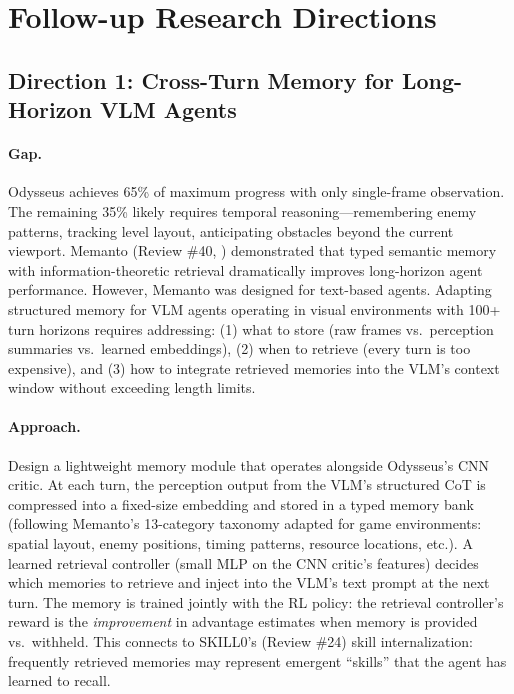\documentclass[11pt]{article}
\begin{document}
\section{Follow-up Research Directions}

\subsection{Direction 1: Cross-Turn Memory for Long-Horizon VLM Agents}

\paragraph{Gap.}
Odysseus achieves 65\% of maximum progress with only single-frame observation. The remaining 35\% likely requires temporal reasoning---remembering enemy patterns, tracking level layout, anticipating obstacles beyond the current viewport. Memanto (Review \#40, \cite{memanto}) demonstrated that typed semantic memory with information-theoretic retrieval dramatically improves long-horizon agent performance. However, Memanto was designed for text-based agents. Adapting structured memory for VLM agents operating in visual environments with 100+ turn horizons requires addressing: (1) what to store (raw frames vs.\ perception summaries vs.\ learned embeddings), (2) when to retrieve (every turn is too expensive), and (3) how to integrate retrieved memories into the VLM's context window without exceeding length limits.

\paragraph{Approach.}
Design a lightweight memory module that operates alongside Odysseus's CNN critic. At each turn, the perception output from the VLM's structured CoT is compressed into a fixed-size embedding and stored in a typed memory bank (following Memanto's 13-category taxonomy adapted for game environments: spatial layout, enemy positions, timing patterns, resource locations, etc.). A learned retrieval controller (small MLP on the CNN critic's features) decides which memories to retrieve and inject into the VLM's text prompt at the next turn. The memory is trained jointly with the RL policy: the retrieval controller's reward is the \emph{improvement} in advantage estimates when memory is provided vs.\ withheld. This connects to SKILL0's (Review \#24) skill internalization: frequently retrieved memories may represent emergent ``skills'' that the agent has learned to recall.
\end{document}
